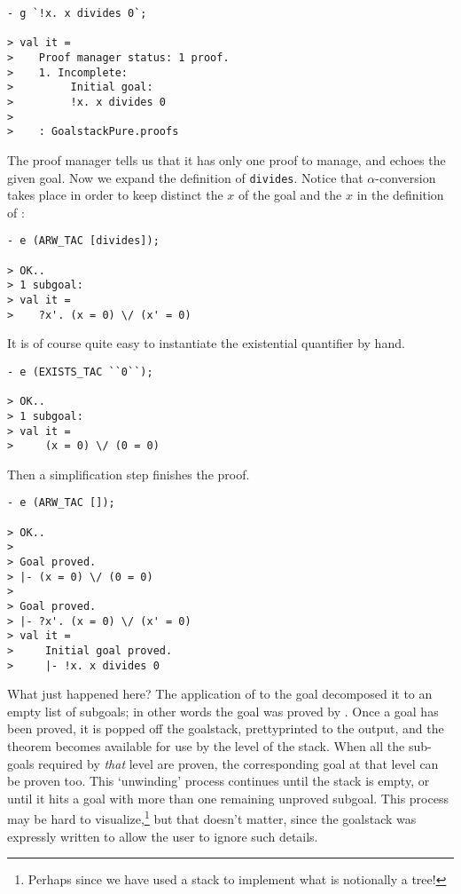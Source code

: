 \begin{session}\begin{verbatim}
- g `!x. x divides 0`;

> val it =
>    Proof manager status: 1 proof.
>    1. Incomplete:
>         Initial goal:
>         !x. x divides 0
>
>    : GoalstackPure.proofs
\end{verbatim}\end{session}
The proof manager tells us that it has only one proof to manage, and
echoes the given goal.  Now we expand the definition of
\verb+divides+. Notice that $\alpha$-conversion takes place in order to
keep distinct the $x$ of the goal and the $x$ in the definition of
:
\begin{session}\begin{verbatim}
- e (ARW_TAC [divides]);

> OK..
> 1 subgoal:
> val it =
>    ?x'. (x = 0) \/ (x' = 0)
\end{verbatim}\end{session}
It is of course quite easy to instantiate the existential quantifier by
hand.
\begin{session}\begin{verbatim}
- e (EXISTS_TAC ``0``);

> OK..
> 1 subgoal:
> val it =
>     (x = 0) \/ (0 = 0)
\end{verbatim}\end{session}
Then a simplification step finishes the proof.
\begin{session}\begin{verbatim}
- e (ARW_TAC []);

> OK..
>
> Goal proved.
> |- (x = 0) \/ (0 = 0)
>
> Goal proved.
> |- ?x'. (x = 0) \/ (x' = 0)
> val it =
>     Initial goal proved.
>     |- !x. x divides 0
\end{verbatim}\end{session}

What just happened here? The application of  to the goal
decomposed it to an empty list of subgoals; in other words the goal was
proved by .  Once a goal has been proved, it is popped off
the goalstack, prettyprinted to the output, and the theorem becomes
available for use by the level of the stack. When all the sub-goals
required by {\it that\/} level are proven, the corresponding goal at
that level can be proven too.  This `unwinding' process continues until
the stack is empty, or until it hits a goal with more than one remaining
unproved subgoal. This process may be hard to
visualize,\footnote{Perhaps since we have used a stack to implement what
is notionally a tree!} but that doesn't matter, since the goalstack was
expressly written to allow the user to ignore such details.

